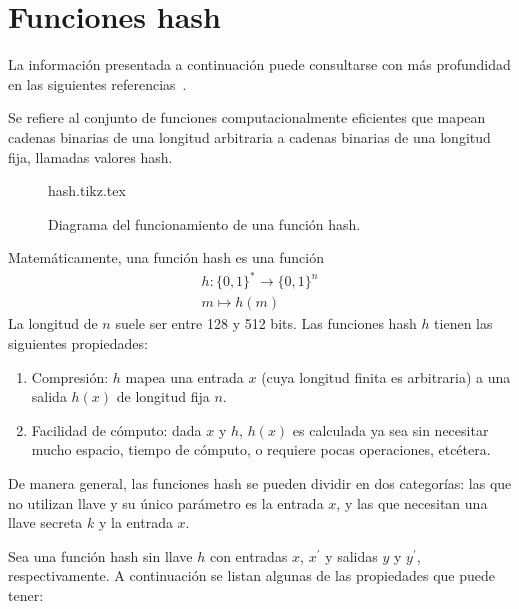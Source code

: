 %
%

\section{Funciones hash}
\label{sec:hash}

La información presentada a continuación puede consultarse con más profundidad
en las siguientes referencias~\cite{hash_hussein, menezes,
DBLP:series/isc/DelfsK07, hash_gupta}.

Se refiere al conjunto de funciones computacionalmente eficientes que
mapean cadenas binarias de una longitud arbitraria a cadenas binarias
de una longitud fija, llamadas valores hash.

\begin{figure}
  \begin{center}
    {hash.tikz.tex}
    \caption{Diagrama del funcionamiento de una función hash.}
   \end{center}
\end{figure}

Matemáticamente, una función hash es una función
\begin{equation}
  \label{funcion_hash_def}
  \begin{split}
    h: \{0, 1\}^* \longrightarrow \{0,1\}^n \\
    m \longmapsto h(m)
  \end{split}
\end{equation}
La longitud de $n$ suele ser entre 128 y 512 bits. Las funciones hash
$h$ tienen las siguientes propiedades:

\begin{enumerate}
  \item Compresión: $h$ mapea una entrada $x$ (cuya longitud
    finita es arbitraria) a una salida $h(x)$ de longitud fija $n$.
  \item Facilidad de cómputo: dada $x$ y $h$, $h(x)$ es
    calculada ya sea sin necesitar mucho espacio, tiempo de cómputo, o
    requiere pocas operaciones, etcétera.
\end{enumerate}

De manera general, las funciones hash se pueden dividir en dos
categorías: las que no utilizan llave y su único parámetro es la entrada
$x$, y las que necesitan una llave secreta $k$ y la entrada $x$.

Sea una función hash sin llave $h$ con entradas $x$, $x^\prime$ y
salidas $y$ y $y^\prime$, respectivamente. A continuación se listan
algunas de las propiedades que puede tener:

